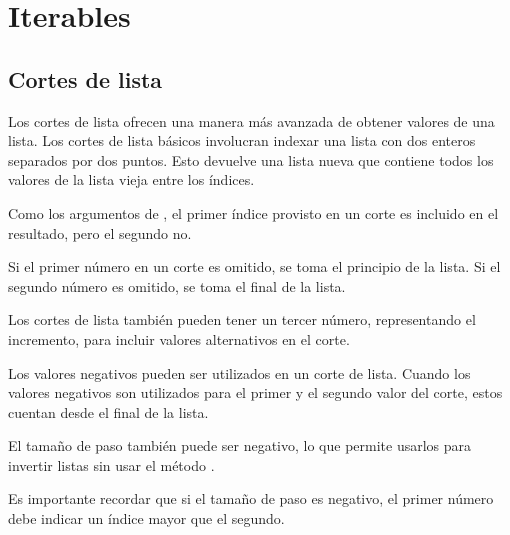 \chapter{Iterables}


\section{Cortes de lista}

Los cortes de lista ofrecen una manera más avanzada de obtener valores de una lista. Los cortes de lista básicos involucran indexar una lista con dos enteros separados por dos puntos. Esto devuelve una lista nueva que contiene todos los valores de la lista vieja entre los índices.


Como los argumentos de , el primer índice provisto en un corte es incluido en el resultado, pero el segundo no.\smallskip

Si el primer número en un corte es omitido, se toma el principio de la lista. Si el segundo número es omitido, se toma el final de la lista.


Los cortes de lista también pueden tener un tercer número, representando el incremento, para incluir valores alternativos en el corte.


Los valores negativos pueden ser utilizados en un corte de lista. Cuando los valores negativos son utilizados para el primer y el segundo valor del corte, estos cuentan desde el final de la lista.


El tamaño de paso también puede ser negativo, lo que permite usarlos para invertir listas sin usar el método .


Es importante recordar que si el tamaño de paso es negativo, el primer número debe indicar un índice mayor que el segundo.\smallskip

